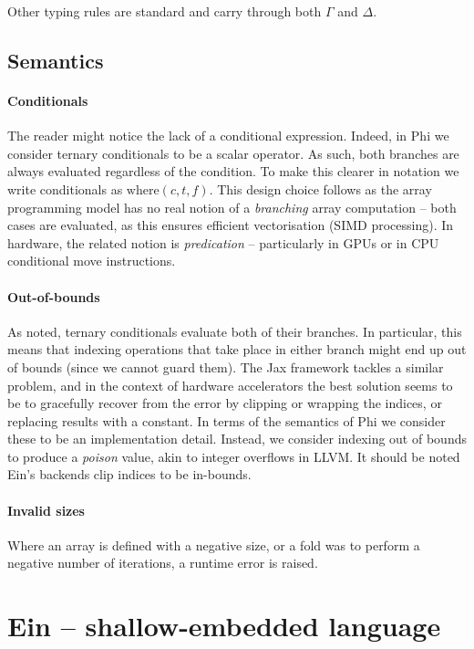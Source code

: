 Other typing rules are standard and carry through both $\Gamma$ and $\Delta$.

\subsection{Semantics}

\paragraph{Conditionals} The reader might notice the lack of a conditional expression. Indeed, in Phi we consider ternary conditionals to be a scalar operator. As such, both branches are always evaluated regardless of the condition. To make this clearer in notation we write conditionals as $\mathrm{where}(c, t, f)$. This design choice follows as the array programming model has no real notion of a \textit{branching} array computation -- both cases are evaluated, as this ensures efficient vectorisation (SIMD processing). In hardware, the related notion is \textit{predication} -- particularly in GPUs or in CPU conditional move instructions.

\paragraph{Out-of-bounds} As noted, ternary conditionals evaluate both of their branches. In particular, this means that indexing operations that take place in either branch might end up out of bounds (since we cannot guard them). 
The Jax framework tackles a similar problem, and in the context of hardware accelerators the best solution seems to be to gracefully recover from the error by clipping or wrapping the indices, or replacing results with a constant. 
In terms of the semantics of Phi we consider these to be an implementation detail. Instead, we consider indexing out of bounds to produce a \textit{poison} value, akin to integer overflows in LLVM. It should be noted Ein's backends clip indices to be in-bounds.

\paragraph{Invalid sizes} Where an array is defined with a negative size, or a fold was to perform a negative number of iterations, a runtime error is raised. 

\section{Ein -- shallow-embedded language}

